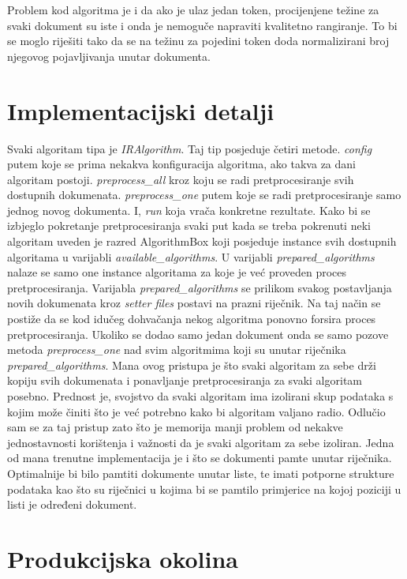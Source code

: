 \documentclass[a4paper,12pt]{article}
\begin{document}
Problem kod algoritma je i da ako je ulaz jedan token, procijenjene težine za svaki dokument su iste i onda je nemoguče napraviti kvalitetno rangiranje. To bi se moglo riješiti tako da se na težinu za pojedini token doda normalizirani broj njegovog pojavljivanja unutar dokumenta.

\section{Implementacijski detalji}

Svaki algoritam tipa je \textit{IRAlgorithm}. Taj tip posjeduje četiri metode. \textit{config} putem koje se prima nekakva konfiguracija algoritma, ako takva za dani algoritam postoji. \textit{preprocess\_all} kroz koju se radi pretprocesiranje svih dostupnih dokumenata. \textit{preprocess\_one} putem koje se radi pretprocesiranje samo jednog novog dokumenta. I, \textit{run} koja vrača konkretne rezultate. Kako bi se izbjeglo pokretanje pretprocesiranja svaki put kada se treba pokrenuti neki algoritam uveden je razred AlgorithmBox koji posjeduje instance svih dostupnih algoritama u varijabli \textit{available\_algorithms}. U varijabli \textit{prepared\_algorithms} nalaze se samo one instance algoritama za koje je već proveden proces pretprocesiranja. Varijabla \textit{prepared\_algorithms} se prilikom svakog postavljanja novih dokumenata kroz \textit{setter files} postavi na prazni riječnik. Na taj način se postiže da se kod idučeg dohvačanja nekog algoritma ponovno forsira proces pretprocesiranja. Ukoliko se dodao samo jedan dokument onda se samo pozove metoda \textit{preprocess\_one} nad svim algoritmima koji su unutar riječnika \textit{prepared\_algorithms}. Mana ovog pristupa je što svaki algoritam za sebe drži kopiju svih dokumenata i ponavljanje pretprocesiranja za svaki algoritam posebno. Prednost je, svojstvo da svaki algoritam ima izolirani skup podataka s kojim može činiti što je već potrebno kako bi algoritam valjano radio. Odlučio sam se za taj pristup zato što je memorija manji problem od nekakve jednostavnosti korištenja i važnosti da je svaki algoritam za sebe izoliran. Jedna od mana trenutne implementacija je i što se dokumenti pamte unutar riječnika. Optimalnije bi bilo pamtiti dokumente unutar liste, te imati potporne strukture podataka kao što su riječnici u kojima bi se pamtilo primjerice na kojoj poziciji u listi je određeni dokument.

\section{Produkcijska okolina}
\end{document}

